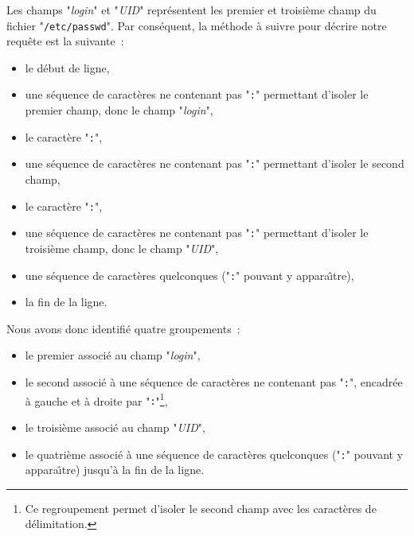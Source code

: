 Les champs "{\sl login}" et "{\sl UID}" repr{\'e}sentent les premier et
troisi{\`e}me champ du fichier "{\tt /etc/passwd}". Par cons{\'e}quent, la m{\'e}thode
{\`a} suivre pour d{\'e}crire notre requ{\^e}te est la suivante~:
\begin{itemize}
	\item	le d{\'e}but de ligne,\\[2ex]
	\item	une s{\'e}quence de caract{\`e}res ne contenant pas "{\tt :}" permettant
			d'isoler le premier champ, donc le champ "{\sl login}",\\[2ex]
	\item	le caract{\`e}re "{\tt :}",\\[2ex]
	\item	une s{\'e}quence de caract{\`e}res ne contenant pas "{\tt :}" permettant
			d'isoler le second champ,\\[2ex]
	\item	le caract{\`e}re "{\tt :}",\\[2ex]
	\item	une s{\'e}quence de caract{\`e}res ne contenant pas "{\tt :}" permettant
			d'isoler le troisi{\`e}me  champ, donc le champ "{\sl UID}",\\[2ex]
	\item	une s{\'e}quence de caract{\`e}res quelconques ("{\tt :}" pouvant y
			appara{\^\i}tre),\\[2ex]
	\item	la fin de la ligne.
\end{itemize}
Nous avons donc identifi{\'e} quatre groupements~:
\begin{itemize}
	\item	le premier associ{\'e} au champ "{\sl login}",\\[2ex]
	\item	le second associ{\'e} {\`a} une s{\'e}quence de caract{\`e}res ne
			contenant pas "{\tt :}", encadr{\'e}e {\`a} gauche et {\`a} droite par
			"{\tt :}"\footnote{Ce regroupement permet d'isoler le second
			champ avec les caract{\`e}res de d{\'e}limitation.},\\[2ex]
	\item	le troisi{\`e}me associ{\'e} au champ "{\sl UID}",\\[2ex]
	\item	le quatri{\`e}me associ{\'e} {\`a} une s{\'e}quence de caract{\`e}res quelconques
			("{\tt :}" pouvant y appara{\^\i}tre) jusqu'{\`a} la fin de la ligne.
\end{itemize}

